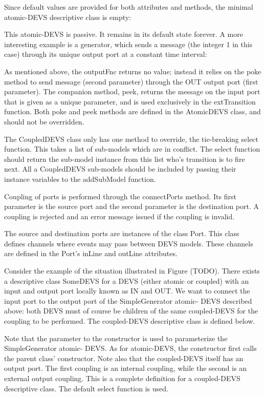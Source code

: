 Since default values are provided for both attributes and methods, the minimal atomic-DEVS descriptive class is empty:


This atomic-DEVS is passive. It remains in its default state forever. A more interesting example is a generator, which sends a message 
(the integer 1 in this case) through its unique output port at a constant time interval:


As mentioned above, the outputFnc returns no value; instead it relies on the poke method to send message (second parameter) through the 
OUT output port (first parameter). The companion method, peek, returns the message on the input port that is given as a unique parameter, 
and is used exclusively in the extTransition function. Both poke and peek methods are defined in the AtomicDEVS class, and should not be 
overridden.

The CoupledDEVS class only has one method to override, the tie-breaking select function. This takes a list of sub-models which are in 
conflict. The select function should return the sub-model instance from this list who's transition is to fire next. All a CoupledDEVS 
sub-models should be included by passing their instance variables to the addSubModel function.

Coupling of ports is performed through the connectPorts method. Its first parameter is the source port and the second parameter is the 
destination port. A coupling is rejected and an error message issued if the coupling is invalid.

The source and destination ports are instances of the class Port. This class defines channels where events may pass between DEVS models. 
These channels are defined in the Port's inLine and outLine attributes.

Consider the example of the situation illustrated in Figure (TODO). There exists a descriptive class SomeDEVS for a DEVS (either atomic 
or coupled) with an input and output port locally known as IN and OUT. We want to connect the input port to the output port of the 
SimpleGenerator atomic- DEVS described above: both DEVS must of course be children of the same coupled-DEVS for the coupling to be 
performed. The coupled-DEVS descriptive class is defined below.


Note that the parameter to the constructor is used to parameterize the SimpleGenerator atomic- DEVS. As for atomic-DEVS, the constructor 
first calls the parent class' constructor. Note also that the coupled-DEVS itself has an output port. The first coupling is an internal 
coupling, while the second is an external output coupling. This is a complete definition for a coupled-DEVS descriptive class. The 
default select function is used.

